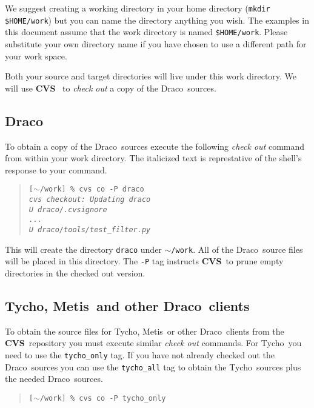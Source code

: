 \documentclass[10pt]{nmemo}
\newcommand{\comp}[1]{\normalfont\normalsize\texttt{#1}}
\newcommand{\draco}{{\normalfont\sffamily Draco}}
\newcommand{\tycho}{{\normalfont\sffamily Tycho}}
\newcommand{\metis}{{\normalfont\sffamily Metis}}
\newcommand{\cvs}{{\normalfont\bfseries CVS}}
\begin{document}
We suggest creating a working directory in your home directory
(\comp{mkdir \${HOME}/work}) but you can name the directory anything
you wish.  The examples in this document assume that the work
directory is named \comp{\${HOME}/work}.  Please substitute your own
directory name if you have chosen to use a different path for your
work space.

Both your source and target directories will live under this work
directory.  We will use \cvs~\cite{cvs} to \emph{check out} a copy of
the \draco\ sources.  

\subsection{\draco}

To obtain a copy of the \draco\ sources execute the following
\emph{check out} command from within your work directory.  The
italicized text is represtative of the shell's response to your
command.

\footnotesize
\begin{verse}
\texttt{[$\sim$/work] \% cvs co -P draco \\
\emph{cvs checkout: Updating draco \\
U draco/.cvsignore \\
      ... \\
U draco/tools/test\_filter.py}}
\end{verse}
\normalsize

This will create the directory \comp{draco} under \comp{$\sim$/work}.  All
of the \draco\ source files will be placed in this directory.  The
\comp{-P} tag instructs \cvs\ to prune empty directories in the
checked out version.  

\subsection{\tycho, \metis\ and other \draco\ clients}

To obtain the source files for \tycho, \metis\ or other \draco\ 
clients from the \cvs\ repository you must execute similar 
\emph{check out} commands.  For \tycho\ you need to use the
\comp{tycho\_only} tag.  If you have not already checked out the
\draco\ sources you can use the \comp{tycho\_all} tag to obtain the
\tycho\ sources plus the needed \draco\ sources.

\footnotesize
\begin{verse}
\texttt{[$\sim$/work] \% cvs co -P tycho\_only}
\end{verse}
\normalsize
\end{document}
